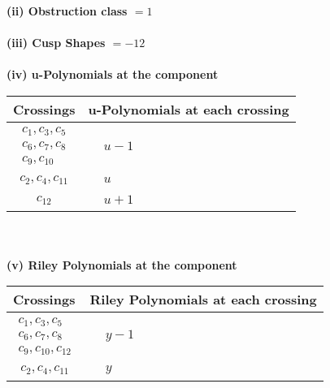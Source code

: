 \documentclass[1p]{elsarticle_modified}
\theoremstyle{definition}
\begin{document}
\flushleft \textbf{(ii) Obstruction class $= 1$}\\~\\
\flushleft \textbf{(iii) Cusp Shapes $= -12$}\\~\\
\newpage\renewcommand{\arraystretch}{1}
\flushleft \textbf{(iv) u-Polynomials at the component}\newline \\
\begin{tabular}{m{50pt}|m{274pt}}
Crossings & \hspace{64pt}u-Polynomials at each crossing \\
\hline $$\begin{aligned}c_{1},c_{3},c_{5}\\c_{6},c_{7},c_{8}\\c_{9},c_{10}\end{aligned}$$&$\begin{aligned}
&u-1
\end{aligned}$\\
\hline $$\begin{aligned}c_{2},c_{4},c_{11}\end{aligned}$$&$\begin{aligned}
&u
\end{aligned}$\\
\hline $$\begin{aligned}c_{12}\end{aligned}$$&$\begin{aligned}
&u+1
\end{aligned}$\\
\hline
\end{tabular}\\~\\
\newpage\renewcommand{\arraystretch}{1}
\flushleft \textbf{(v) Riley Polynomials at the component}\newline \\
\begin{tabular}{m{50pt}|m{274pt}}
Crossings & \hspace{64pt}Riley Polynomials at each crossing \\
\hline $$\begin{aligned}c_{1},c_{3},c_{5}\\c_{6},c_{7},c_{8}\\c_{9},c_{10},c_{12}\end{aligned}$$&$\begin{aligned}
&y-1
\end{aligned}$\\
\hline $$\begin{aligned}c_{2},c_{4},c_{11}\end{aligned}$$&$\begin{aligned}
&y
\end{aligned}$\\
\hline
\end{tabular}\\~\\
\end{document}
